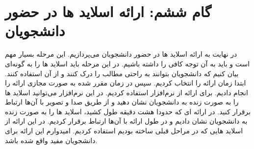 \def \Subject {گام ششم: ارائه اسلاید ها در حضور دانشجویان}
\section{\Subject}

در نهایت به ارائه اسلاید ها در حضور دانشجویان می‌پردازیم. این مرحله بسیار مهم است و باید به آن توجه کافی را داشته باشیم. در این مرحله باید اسلاید ها را به گونه‌ای بیان کنیم که دانشجویان بتوانند به راحتی مطالب را درک کنند و از آن استفاده کنند.
ابتدا زمان ارائه را انتخاب کردیم.
سپس در زمان مقرر شده به صورت مجازی ارائه را انجام دادیم.
برای ارائه از نرم‌افزار  استفاده کردیم.
در این نرم‌افزار می‌توانید اسلاید ها را به صورت زنده به دانشجویان نشان دهید و از طریق صدا و تصویر با آن‌ها ارتباط برقرار کنید.
در ارائه ای که حدودا هشت دقیقه طول کشید، اسلاید ها را به صورت زنده به دانشجویان نشان دادیم و در طول ارائه با آن‌ها ارتباط برقرار کردیم.
در این ارائه از اسلاید هایی که در مراحل قبلی ساخته بودیم استفاده کردیم.
امیدوارم این ارائه برای دانشجویان مفید واقع شده باشد.
